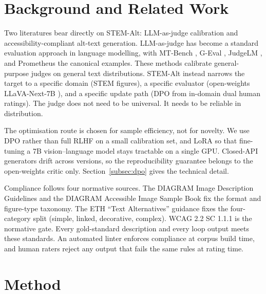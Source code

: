 \documentclass[pdflatex,sn-mathphys-num]{sn-jnl}
\begin{document}
\section{Background and Related Work}\label{sec:related}

Two literatures bear directly on STEM-Alt: LLM-as-judge calibration and accessibility-compliant alt-text generation. LLM-as-judge has become a standard evaluation approach in language modelling, with MT-Bench \cite{zheng2023mtbench}, G-Eval \cite{liu2023geval}, JudgeLM \cite{zhu2023judgelm}, and Prometheus \cite{kim2024prometheus} the canonical examples. These methods calibrate general-purpose judges on general text distributions. STEM-Alt instead narrows the target to a specific domain (STEM figures), a specific evaluator (open-weights LLaVA-Next-7B \cite{llavaNext2024}), and a specific update path (DPO \cite{rafailov2023dpo} from in-domain dual human ratings). The judge does not need to be universal. It needs to be reliable in distribution.

The optimisation route is chosen for sample efficiency, not for novelty. We use DPO \cite{rafailov2023dpo} rather than full RLHF \cite{christiano2017deeprlhp} on a small calibration set, and LoRA \cite{hu2022lora} so that fine-tuning a 7B vision--language model stays tractable on a single GPU. Closed-API generators drift across versions, so the reproducibility guarantee belongs to the open-weights critic only. Section~\ref{subsec:dpo} gives the technical detail.

Compliance follows four normative sources. The DIAGRAM Image Description Guidelines \cite{diagramGuidelines2019} and the DIAGRAM Accessible Image Sample Book \cite{diagramSampleBook2019} fix the format and figure-type taxonomy. The ETH ``Text Alternatives'' guidance \cite{ethStaffnetAltText} fixes the four-category split (simple, linked, decorative, complex). WCAG 2.2 SC 1.1.1 \cite{wcag22nontext} is the normative gate. Every gold-standard description and every loop output meets these standards. An automated linter enforces compliance at corpus build time, and human raters reject any output that fails the same rules at rating time.

\section{Method}\label{sec:method}
\end{document}
